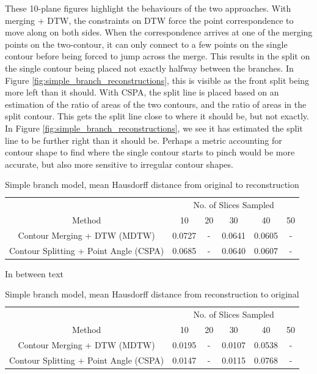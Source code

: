 \documentclass[11p, titlepage]{article}
\begin{document}
These 10-plane figures highlight the behaviours of the two approaches. With merging + DTW, the constraints on DTW force the point correspondence to move along on both sides. When the correspondence arrives at one of the merging points on the two-contour, it can only connect to a few points on the single contour before being forced to jump across the merge. This results in the split on the single contour being placed not exactly halfway between the branches. In Figure \ref{fig:simple_branch_reconstructions}, this is visible as the front split being more left than it should. With CSPA, the split line is placed based on an estimation of the ratio of areas of the two contours, and the ratio of areas in the split contour. This gets the split line close to where it should be, but not exactly. In Figure \ref{fig:simple_branch_reconstructions}, we see it has estimated the split line to be further right than it should be. Perhaps a metric accounting for contour shape to find where the single contour starts to pinch would be more accurate, but also more sensitive to irregular contour shapes.

\begin{table}[h]
\begin{tabular}{ | c | c | c | c | c | c | }
\hline
& \multicolumn{5}{c|}{No. of Slices Sampled} \\
\cline{2-6}
Method & 10 & 20 & 30 & 40 & 50 \\
\hline
Contour Merging + DTW (MDTW) & 0.0727 & - & 0.0641 & 0.0605 & - \\
Contour Splitting + Point Angle (CSPA) & 0.0685 & - & 0.0640 & 0.0607 & - \\
\hline
\end{tabular}
\caption{Simple branch model, mean Hausdorff distance from original to reconstruction}
\label{table:simple_branch_forward}
\end{table}

In between text

\begin{table}[h]
\begin{tabular}{ | c | c | c | c | c | c | }
\hline
& \multicolumn{5}{c|}{No. of Slices Sampled} \\
\cline{2-6}
Method & 10 & 20 & 30 & 40 & 50 \\
\hline
Contour Merging + DTW (MDTW) & 0.0195 & - & 0.0107 & 0.0538 & - \\
Contour Splitting + Point Angle (CSPA) & 0.0147 & - & 0.0115 & 0.0768 & - \\
\hline
\end{tabular}
\caption{Simple branch model, mean Hausdorff distance from reconstruction to original}
\label{table:simple_branch_reverse}
\end{table}
\end{document}

